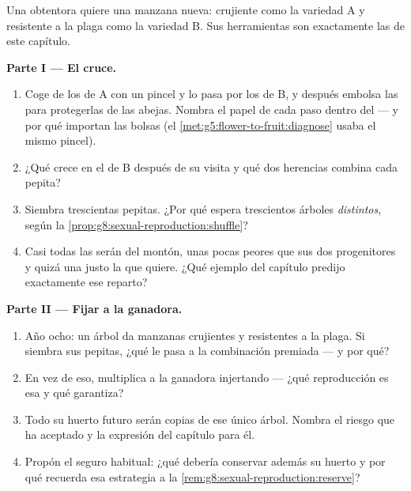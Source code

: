 \begin{problem}\label{pb:g8:sexual-reproduction:1}
Una obtentora quiere una manzana nueva: crujiente como la variedad A y
resistente a la plaga como la variedad B. Sus herramientas son
exactamente las de este capítulo.

\medskip\noindent\textbf{Parte I --- El cruce.}
\begin{enumerate}
  \item Coge  de los  de A con un pincel y lo pasa por
        los  de B, y después embolsa las  para
        protegerlas de las abejas. Nombra el papel de cada paso dentro
        del  --- y por qué importan las bolsas (el
        \cref{met:g5:flower-to-fruit:diagnose} usaba el mismo pincel).
  \item ¿Qué crece en el  de B después de su visita y qué dos
        herencias combina cada pepita?
  \item Siembra trescientas pepitas. ¿Por qué espera trescientos
        árboles \emph{distintos}, según la
        \cref{prop:g8:sexual-reproduction:shuffle}?
  \item Casi todas las  serán del montón, unas pocas peores
        que sus dos progenitores y quizá una justo la que quiere. ¿Qué
        ejemplo del capítulo predijo exactamente ese reparto?
\end{enumerate}

\medskip\noindent\textbf{Parte II --- Fijar a la ganadora.}
\begin{enumerate}[resume]
  \item Año ocho: un árbol da manzanas crujientes y resistentes a la
        plaga. Si siembra sus pepitas, ¿qué le pasa a la combinación
        premiada --- y por qué?
  \item En vez de eso, multiplica a la ganadora injertando --- ¿qué
        reproducción es esa y qué garantiza?
  \item Todo su huerto futuro serán copias de ese único árbol. Nombra
        el riesgo que ha aceptado y la expresión del capítulo para él.
  \item Propón el seguro habitual: ¿qué debería conservar además su
        huerto y por qué recuerda esa estrategia a la
        \cref{rem:g8:sexual-reproduction:reserve}?
\end{enumerate}


\end{problem}
